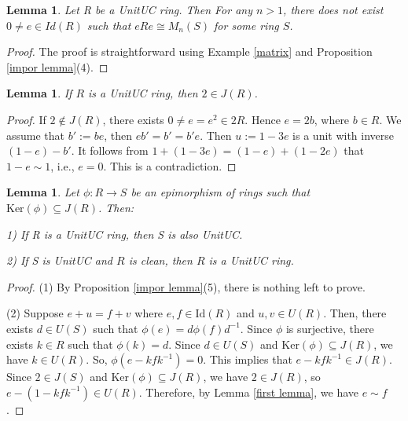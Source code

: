 \documentclass[12pt]{amsart}
\newtheorem{lemma}[theorem]{Lemma}
\theoremstyle{definition}
\begin{document}
\begin{lemma}\label{corner not}
    Let R be a   UnitUC ring. Then For any $n > 1$, there does not exist $0 \neq e \in Id(R)$ such that $eRe \cong M_n(S)$ for some ring $S$.
\end{lemma}
\begin{proof}
    The proof is straightforward using Example \ref{matrix} and Proposition \ref{impor lemma}(4).
\end{proof}


\begin{lemma}
    If $R$ is a   UnitUC ring, then $2 \in J(R)$.
\end{lemma}
\begin{proof}
    If $2 \notin J(R)$, there exists $0 \neq e=e^2 \in 2R$. Hence $e = 2b$, where $b \in R$. We assume that $b':=be$, then $eb' = b' = b'e$. Then
$u := 1 - 3e$ is a unit with inverse $(1 - e) - b'$. It follows from $1+(1-3e) = (1-e)+(1-2e)$ that $1-e \sim 1$, i.e., $e = 0$. This is a contradiction.
\end{proof}


\begin{lemma}\label{ess lemma for ex}
    Let $\phi: R \longrightarrow S$ be an epimorphism of rings such that $\text{Ker}(\phi) \subseteq J(R)$. Then:

1) If R is a   UnitUC ring, then S is also   UnitUC.

2) If S is   UnitUC and $R$ is clean, then $R$ is a   UnitUC ring.
\end{lemma}
\begin{proof}
(1) By Proposition \ref{impor lemma}(5), there is nothing left to prove.

(2) Suppose $ e+u = f+v $ where $ e, f \in \text{Id}(R)$ and $ u, v \in U(R) $. Then, there exists $ d \in U(S) $ such that $\phi(e) = d\phi(f)d^{-1} $. Since $ \phi $ is surjective, there exists $ k \in R $ such that $ \phi(k) = d $. Since $d \in U(S)$ and $\text{Ker}(\phi) \subseteq J(R)$, we have $ k \in U(R) $. So, $ \phi(e-kfk^{-1}) = 0 $. This implies that $ e-kfk^{-1} \in J(R) $. Since $2 \in J(S)$ and $ \text{Ker}(\phi) \subseteq J(R) $, we have $ 2 \in J(R)$, so $ e-(1-kfk^{-1}) \in U(R)$. Therefore, by Lemma \ref{first lemma}, we have $e \sim f $.
\end{proof}
\end{document}
